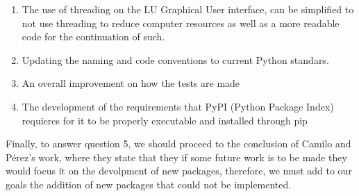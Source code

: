 \begin{enumerate}
    \item The use of threading on the LU Graphical User interface, can be simplified to not use threading to reduce computer resources as well as a more readable code for the continuation of such.
    \item Updating the naming and code conventions to current Python standars.
    \item An overall improvement on how the tests are made
    \item The development of the requirements that PyPI (Python Package Index) requieres for it to be properly executable and installed through pip
\end{enumerate}

Finally, to answer question 5, we should proceed to the conclusion of Camilo and Pérez's work, where they state that they if some future work is to be made they would focus it on the devolpment of new packages, therefore, we must add to our goals the addition of new packages that could not be implemented.


